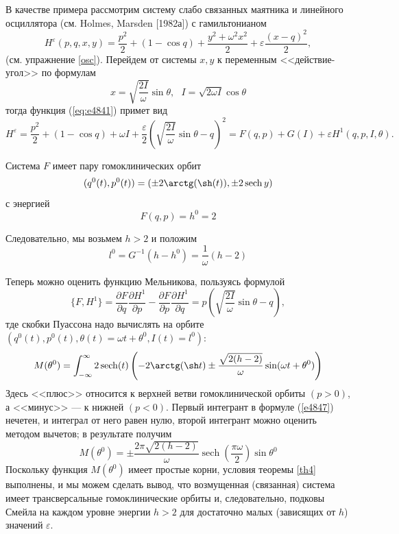 \documentclass[twoside, a4paper]{article}
\DeclareMathOperator{\sech}{sech}
\begin{document}
В качестве примера рассмотрим систему слабо связанных маятника и линейного осциллятора (см. Holmes, Marsden [1982а]) с гамильтонианом 
\begin{equation}
H^\varepsilon(p,q,x,y) = \frac{p^2}{2}+(1-\cos q)+\frac{y^2+\omega^2x^2}{2}+\varepsilon \frac{(x-q)^2}{2},
\label{eq:e4841}
\end{equation}
(см. упражнение \ref{osc}). Перейдем от системы $x,y$ к переменным
<<действие-угол>> по формулам
$$x = \sqrt{\frac{2I}{\omega}}\sin \theta, \text{~~} I=\sqrt{2\omega I}\cos \theta$$
тогда функция (\ref{eq:e4841}) примет вид
\begin{equation}
H^\varepsilon = \frac{p^2}{2}+(1-\cos q)+\omega I+\frac{\varepsilon}{2}\left(\sqrt{\frac{2I}{\omega}}\sin \theta - q\right)^2=F(q,p)+G(I)+\varepsilon H^1(q,p,I,\theta).
\label{e4842}
\end{equation}

Система $F$ имеет пару гомоклинических орбит
\begin{equation}
(q^0(t),p^0(t))=(\pm2\arctg (\sh(t)),\pm2\sech y)
\end{equation}
с энергией
\begin{equation}
F(q,p)=h^0=2
\end{equation}

Следовательно, мы возьмем $h>2$ и положим
\begin{equation}
l^0=G^{-1}(h-h^0)=\frac{1}{\omega}(h-2)
\end{equation}

Теперь можно оценить функцию Мельникова, пользуясь формулой
\begin{equation}
\{F,H^1\}=\frac{\partial F}{\partial q}\frac{\partial H^1}{\partial p}-\frac{\partial F}{\partial p}\frac{\partial H^1}{\partial q} =p\left(\sqrt{\frac{2I}{\omega}}\sin \theta -q\right),
\end{equation}
тде скобки Пуассона надо вычислять на орбите $(q^0(t),p^0(t),\theta(t)=\omega t + \theta^0, I(t)=l^0)\colon$
\begin{equation}
M(\theta^0)=\int_{-\infty}^{\infty}2\sech(t)\left(-2\arctg(\sh t)\pm\frac{\sqrt{2(h-2)}}{\omega}\sin(\omega t + \theta^0)\right)
\label{e4847}
\end{equation}
Здесь <<плюс>> относится к верхней ветви гомоклинической орбиты $(p > 0)$, а <<минус>> — к нижней $(p < 0)$. Первый интегрант в формуле (\ref{e4847}) нечетен, и интеграл от него равен нулю, второй интегрант можно оценить методом вычетов; в результате получим
\begin{equation}
M(\theta^0)=\pm\frac{2\pi\sqrt{2(h-2)}}{\omega}\sech\left(\frac{\pi\omega}{2}\right)\sin\theta^0
\end{equation}
Поскольку функция $M(\theta^0)$ имеет простые корни, условия теоремы \ref{th4} выполнены, и мы можем сделать вывод, что возмущенная (связанная) система имеет трансверсальные гомоклинические орбиты и, следовательно,
подковы Смейла на каждом уровне энергии $h>2$ для достаточно малых (зависящих от $h$) значений $\varepsilon$.
\end{document}
